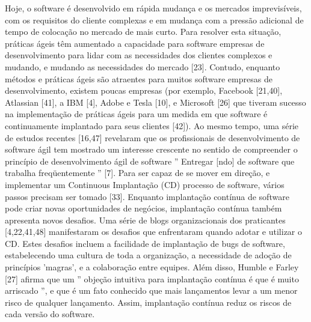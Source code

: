 Hoje, o software é desenvolvido em rápida mudança e os mercados imprevisíveis,
com os requisitos do cliente complexas e em mudança
com a pressão adicional de tempo de colocação no mercado de mais curto. Para
resolver esta
situação, práticas ágeis têm aumentado a capacidade para software
empresas de desenvolvimento para lidar com as necessidades dos clientes complexos
 e mudando, e mudando as necessidades do mercado [23]. Contudo,
enquanto métodos e práticas ágeis são atraentes para muitos software
empresas de desenvolvimento, existem poucas empresas (por exemplo, Facebook
[21,40], Atlassian [41], a IBM [4], Adobe e Tesla [10], e Microsoft
[26] que tiveram sucesso na implementação de práticas ágeis para um
medida em que software é continuamente implantado para seus clientes
[42]). Ao mesmo tempo, uma série de estudos recentes [16,47]
revelaram que os profissionais de desenvolvimento de software ágil tem
mostrado um interesse crescente no sentido de compreender o princípio de
desenvolvimento ágil de software '' Entregar [ndo] de software que trabalha
freqüentemente '' [7].
Para ser capaz de se mover em direção, e implementar um Continuous
Implantação (CD) processo de software, vários passos precisam ser
tomado [33]. Enquanto implantação contínua de software pode criar
novas oportunidades de negócios, implantação contínua também apresenta
novos desafios. Uma série de blogs organizacionais dos praticantes
[4,22,41,48] manifestaram os desafios que enfrentaram quando
adotar e utilizar o CD. Estes desafios incluem a facilidade de
implantação de bugs de software, estabelecendo uma cultura de toda a organização,
a necessidade de adoção de princípios 'magras', e a colaboração entre equipes.
Além disso, Humble e Farley [27] afirma que um '' objeção intuitiva para
implantação contínua é que é muito arriscado '', e que
é um fato conhecido que mais lançamentos levar a um menor risco de qualquer
lançamento. Assim, implantação contínua reduz os riscos de cada
versão do software.

